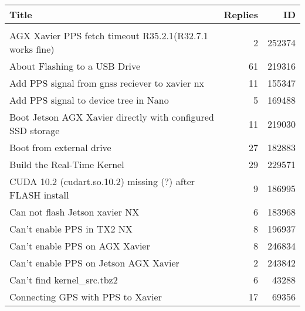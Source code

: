 \small
\begin{longtable}{p{}rr}
    Title                                                                                               & Replies & ID     \\
    \hline                                                                                                                 \\
    AGX Xavier PPS fetch timeout R35.2.1(R32.7.1 works fine)                                            & 2       & 252374 \\
    About Flashing to a USB Drive                                                                       & 61      & 219316 \\
    Add PPS signal from gnss reciever to xavier nx                                                      & 11      & 155347 \\
    Add PPS signal to device tree in Nano                                                               & 5       & 169488 \\
    Boot Jetson AGX Xavier directly with configured SSD storage                                         & 11      & 219030 \\
    Boot from external drive                                                                            & 27      & 182883 \\
    Build the Real-Time Kernel                                                                          & 29      & 229571 \\
    CUDA 10.2 (cudart.so.10.2) missing (?) after FLASH install                                          & 9       & 186995 \\
    Can not flash Jetson xavier NX                                                                      & 6       & 183968 \\
    Can’t enable PPS in TX2 NX                                                                          & 8       & 196937 \\
    Can’t enable PPS on AGX Xavier                                                                      & 8       & 246834 \\
    Can’t enable PPS on Jetson AGX Xavier                                                               & 2       & 243842 \\
    Can’t find kernel\_src.tbz2                                                                         & 6       & 43288  \\
    Connecting GPS with PPS to Xavier                                                                   & 17      & 69356  \\

\end{longtable}
